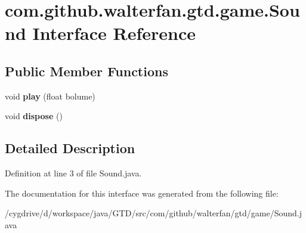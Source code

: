 \hypertarget{interfacecom_1_1github_1_1walterfan_1_1gtd_1_1game_1_1Sound}{\section{com.\-github.\-walterfan.\-gtd.\-game.\-Sound Interface Reference}
\label{interfacecom_1_1github_1_1walterfan_1_1gtd_1_1game_1_1Sound}
}
\subsection*{Public Member Functions}
\begin{DoxyCompactItemize}
\item 
\hypertarget{interfacecom_1_1github_1_1walterfan_1_1gtd_1_1game_1_1Sound_ae49912767e70da1f99a0b72243accabf}{void {\bfseries play} (float bolume)}\label{interfacecom_1_1github_1_1walterfan_1_1gtd_1_1game_1_1Sound_ae49912767e70da1f99a0b72243accabf}

\item 
\hypertarget{interfacecom_1_1github_1_1walterfan_1_1gtd_1_1game_1_1Sound_a723e3eec2b0e35c7cfec2473be94a956}{void {\bfseries dispose} ()}\label{interfacecom_1_1github_1_1walterfan_1_1gtd_1_1game_1_1Sound_a723e3eec2b0e35c7cfec2473be94a956}

\end{DoxyCompactItemize}


\subsection{Detailed Description}


Definition at line 3 of file Sound.\-java.



The documentation for this interface was generated from the following file\-:\begin{DoxyCompactItemize}
\item 
/cygdrive/d/workspace/java/\-G\-T\-D/src/com/github/walterfan/gtd/game/Sound.\-java\end{DoxyCompactItemize}
